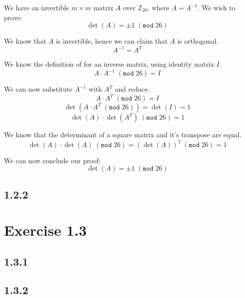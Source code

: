 \documentclass[11pt]{report}
\begin{document}
We have an invertible $m \times m$ matrix $A$ over $\mathbb{Z}_{26}$, where $A = A^{-1}$. We wish to prove:
$$\det(A) = \pm 1\;(\mathtt{mod}\;26)$$

We know that $A$ is invertible, hence we can claim that $A$ is orthogonal.
$$A^{-1}=A^T$$

We know the definition of for an inverse matrix, using identity matrix $I$.
$$A \cdot A^{-1}\;(\mathtt{mod}\;26) = I$$

We can now substitute $A^{-1}$ with $A^T$ and reduce.
$$A \cdot A^T\;(\mathtt{mod}\;26)= I$$
$$\det(A \cdot A^T\;(\mathtt{mod}\;26)) = \det(I) = 1$$
$$\det(A) \cdot \det(A^T)\;(\mathtt{mod}\;26) = 1$$

We know that the determinant of a square matrix and it's transpose are equal.
$$\det(A) \cdot \det(A)\;(\mathtt{mod}\;26) = (\det(A))^2\;(\mathtt{mod}\;26) = 1$$

We can now conclude our proof:
$$\det(A) = \pm 1\;(\mathtt{mod}\;26)$$

\subsection*{1.2.2}

\section*{Exercise 1.3}
\subsection*{1.3.1}

\subsection*{1.3.2}
\end{document}
